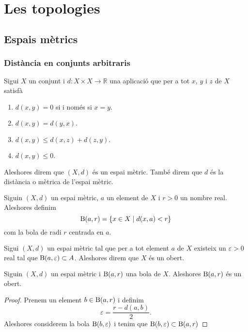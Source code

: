 \documentclass[../Apunts.tex]{subfiles}
\begin{document}
\chapter{Les topologies}
	\section{Espais mètrics}
	\subsection{Distància en conjunts arbitraris}
	\begin{definition}
		\label{def:espai mètric}
		\label{def:distància}
		Sigui \(X\) un conjunt i \(d\colon X\times X\longrightarrow\mathbb{R}\) una aplicació que per a tot \(x\), \(y\) i \(z\) de \(X\) satisfà
		\begin{enumerate}
			\item \(d(x,y)=0\) si i només si \(x=y\).
			\item \(d(x,y)=d(y,x)\).
			\item \(d(x,y)\leq d(x,z)+d(z,y)\).
			\item \(d(x,y)\leq0\).
		\end{enumerate}
		Aleshores direm que \((X,d)\) és un espai mètric. També direm que \(d\) és la distància o mètrica de l'espai mètric.
	\end{definition}
	\begin{definition}[Bola]
		\label{def:bola}
		Siguin \((X,d)\) un espai mètric, \(a\) un element de \(X\) i \(r>0\) un nombre real. Aleshores definim
		\[\operatorname{B}(a,r)=\{x\in X\mid d(x,a)<r\}\]
		com la bola de radi \(r\) centrada en \(a\).
	\end{definition}
	\begin{definition}[Obert]
		\label{def:obert}
		Sigui \((X,d)\) un espai mètric tal que per a tot element \(a\) de \(X\) existeix un \(\varepsilon>0\) real tal que \(\operatorname{B}(a,\varepsilon)\subset A\). Aleshores direm que \(X\) és un obert.
	\end{definition}
	\begin{proposition}
		Siguin \((X,d)\) un espai mètric i \(\operatorname{B}(a,r)\) una bola de \(X\). Aleshores \(\operatorname{B}(a,r)\) és un obert.
		\begin{proof}
			Prenem un element \(b\in\operatorname{B}(a,r)\) i definim
			\[\varepsilon=\frac{r-d(a,b)}{2}.\]
			Aleshores considerem la bola \(\operatorname{B}(b,\varepsilon)\) i tenim que \(\operatorname{B}(b,\varepsilon)\subset\operatorname{B}(a,r)\)
		\end{proof}
	\end{proposition}
\end{document}
